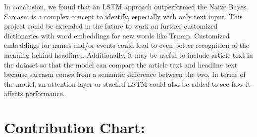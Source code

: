 \documentclass[11pt]{article}
\begin{document}
In conclusion, we found that an LSTM approach outperformed the Naive Bayes.
Sarcasm is a complex concept to identify, especially with only text input.
This project could be extended in the future to work on further
customized dictionaries with word embeddings for new words like Trump.
Customized embeddings for names and/or events could lead to even better
recognition of the meaning behind headlines.
Additionally, it may be useful to include article text in the dataset
so that the model can compare the article text and headline text
because sarcasm comes from a semantic difference between the two.
In terms of the model, an attention layer or stacked LSTM
could also be added to see how it affects performance.

\section{Contribution Chart:}
\end{document}
